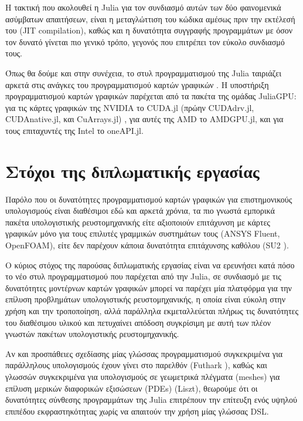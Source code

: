 Η τακτική που ακολουθεί η Julia για τον συνδιασμό αυτών των δύο φαινομενικά ασύμβατων απαιτήσεων, είναι η μεταγλώττιση του κώδικα αμέσως πριν την εκτέλεσή του (JIT compilation), καθώς και η δυνατότητα συγγραφής προγραμμάτων με όσον τον δυνατό γίνεται πιο γενικό τρόπο, γεγονός που επιτρέπει τον εύκολο συνδιασμό τους.

Όπως θα δούμε και στην συνέχεια, το στυλ προγραμματισμού της Julia ταιριάζει αρκετά στις ανάγκες του προγραμματισμού καρτών γραφικών \cite{Besard2019}.
Η υποστήριξη προγραμματισμού καρτών γραφικών παρέχεται από τα πακέτα της ομάδας JuliaGPU: για τις κάρτες γραφικών της NVIDIA το CUDA.jl (πρώην CUDAdrv.jl, CUDAnative.jl, και CuArrays.jl) \cite{Besard2018}, για αυτές της AMD το AMDGPU.jl, και για τους επιταχυντές της Intel το oneAPI.jl.

\section{Στόχοι της διπλωματικής εργασίας}

Παρόλο που οι δυνατότητες προγραμματισμού καρτών γραφικών για επιστημονικούς υπολογισμούς είναι διαθέσιμοι εδώ και αρκετά χρόνια, τα πιο γνωστά εμπορικά πακέτα υπολογιστικής ρευστομηχανικής είτε αξιοποιούν επιτάχυνση με κάρτες γραφικών μόνο για τους επιλυτές γραμμικών συστημάτων τους (ANSYS Fluent, OpenFOAM), είτε δεν παρέχουν κάποια δυνατότητα επιτάχυνσης καθόλου (SU2 \cite{Palacios2013}).


Ο κύριος στόχος της παρούσας διπλωματικής εργασίας είναι να ερευνήσει κατά πόσο το νέο στυλ προγραμματισμού που παρέχεται από την Julia, σε συνδιασμό με τις δυνατότητες μοντέρνων καρτών γραφικών μπορεί να παρέχει μία πλατφόρμα για την επίλυση προβλημάτων υπολογιστικής ρευστομηχανικής, η οποία είναι εύκολη στην χρήση και την τροποποίηση, αλλά παράλληλα εκμεταλλεύεται πλήρως τις δυνατότητες του διαθέσιμου υλικού και πετυχαίνει απόδοση συγκρίσιμη με αυτή των πλέον γνωστών πακέτων υπολογιστικής ρευστομηχανικής.

Αν και προσπάθειες σχεδίασης μίας γλώσσας προγραμματισμού συγκεκριμένα για παράλληλους υπολογισμούς έχουν γίνει στο παρελθόν (Futhark \cite{Henriksen2017}), καθώς και γλωσσών συγκεκριμένα για υπολογισμούς σε γεωμετρικά πλέγματα (meshes) για επίλυση μερικών διαφορικών εξισώσεων (PDEs) (Liszt), θεωρούμε ότι οι δυνατότητες σύνθεσης προγραμμάτων της Julia επιτρέπουν την επίτευξη ενός υψηλού επιπέδου εκφραστηκότητας χωρίς να απαιτούν την χρήση μίας γλώσσας DSL.

